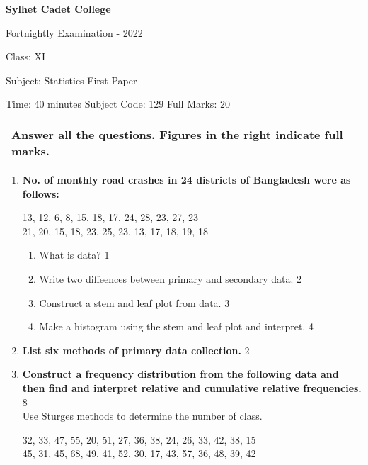 \documentclass{article}
\begin{document}
\begin{center}
  \bfseries\large
  Sylhet Cadet College

\normalsize
Fortnightly Examination - 2022

  Class: XI

  Subject: Statistics First Paper

  Time: 40 minutes \qquad \qquad  \qquad \qquad Subject Code: 129  \qquad  \qquad \qquad  \qquad Full Marks: 20

\end{center}

\noindent
\begin{tabular}{p{\dimexpr\linewidth-2\tabcolsep}}
  Answer all the questions. Figures in the right indicate full marks.\\
  \hline
\end{tabular}

\begin{enumerate}
  \item
  \textbf{No. of monthly road crashes in 24 districts of Bangladesh were as follows:} 
  
  \begin{center}
  13, 12, 6, 8, 15, 18, 17, 24, 28, 23, 27, 23 \\
  21, 20, 15, 18, 23, 25, 23, 13, 17, 18, 19, 18
  \end{center}
  \begin{enumerate}
    \item
	What is data? \hfill 1
    \item
	Write two diffeences between primary and secondary data. \hfill 2
    \item
	Construct a stem and leaf plot from data. \hfill 3
    \item
	Make a histogram using the stem and leaf plot and interpret. \hfill 4
\end{enumerate}

	\item
	\textbf{List six methods of primary data collection.} \hfill 2 \\
	
	\item
	\textbf{Construct a frequency distribution from the following data and then find and interpret relative and cumulative relative frequencies.}  \hfill 8 \\  Use Sturges methods to determine the number of class. \\ 

  \begin{center}
32, 33, 47, 55, 20, 51, 27, 36, 38, 24, 26, 33, 42, 38, 15 \\
45, 31, 45, 68, 49, 41, 52, 30, 17, 43, 57, 36, 48, 39, 42
  \end{center}
\end{enumerate}
\end{document}
